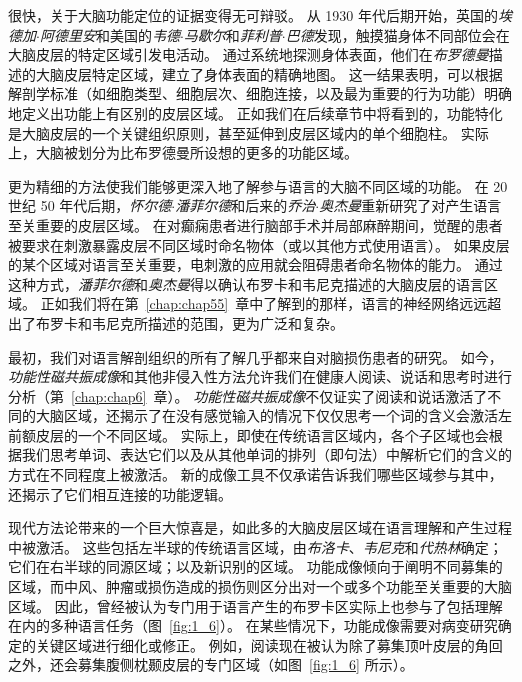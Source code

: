 很快，关于大脑功能定位的证据变得无可辩驳。
从 1930 年代后期开始，英国的\textit{埃德加$\cdot$阿德里安}和美国的\textit{韦德$\cdot$马歇尔}和\textit{菲利普$\cdot$巴德}发现，触摸猫身体不同部位会在大脑皮层的特定区域引发电活动。
通过系统地探测身体表面，他们在\textit{布罗德曼}描述的大脑皮层特定区域，建立了身体表面的精确地图。
这一结果表明，可以根据解剖学标准（如细胞类型、细胞层次、细胞连接，以及最为重要的行为功能）明确地定义出功能上有区别的皮层区域。
正如我们在后续章节中将看到的，功能特化是大脑皮层的一个关键组织原则，甚至延伸到皮层区域内的单个细胞柱。
实际上，大脑被划分为比布罗德曼所设想的更多的功能区域。



更为精细的方法使我们能够更深入地了解参与语言的大脑不同区域的功能。
在 20 世纪 50 年代后期，\textit{怀尔德$\cdot$潘菲尔德}和后来的\textit{乔治$\cdot$奥杰曼}重新研究了对产生语言至关重要的皮层区域。
在对癫痫患者进行脑部手术并局部麻醉期间，觉醒的患者被要求在刺激暴露皮层不同区域时命名物体（或以其他方式使用语言）。
如果皮层的某个区域对语言至关重要，电刺激的应用就会阻碍患者命名物体的能力。
通过这种方式，\textit{潘菲尔德}和\textit{奥杰曼}得以确认布罗卡和韦尼克描述的大脑皮层的语言区域。
正如我们将在第~\ref{chap:chap55}~章中了解到的那样，语言的神经网络远远超出了布罗卡和韦尼克所描述的范围，更为广泛和复杂。


最初，我们对语言解剖组织的所有了解几乎都来自对脑损伤患者的研究。
如今，\textit{功能性磁共振成像}和其他非侵入性方法允许我们在健康人阅读、说话和思考时进行分析（第~\ref{chap:chap6}~章）。
\textit{功能性磁共振成像}不仅证实了阅读和说话激活了不同的大脑区域，还揭示了在没有感觉输入的情况下仅仅思考一个词的含义会激活左前额皮层的一个不同区域。
实际上，即使在传统语言区域内，各个子区域也会根据我们思考单词、表达它们以及从其他单词的排列（即句法）中解析它们的含义的方式在不同程度上被激活。
新的成像工具不仅承诺告诉我们哪些区域参与其中，还揭示了它们相互连接的功能逻辑。



现代方法论带来的一个巨大惊喜是，如此多的大脑皮层区域在语言理解和产生过程中被激活。
这些包括左半球的传统语言区域，由\textit{布洛卡}、\textit{韦尼克}和\textit{代热林}确定； 它们在右半球的同源区域；以及新识别的区域。
功能成像倾向于阐明不同募集的区域，而中风、肿瘤或损伤造成的损伤则区分出对一个或多个功能至关重要的大脑区域。
因此，曾经被认为专门用于语言产生的布罗卡区实际上也参与了包括理解在内的多种语言任务（图~\ref{fig:1_6}）。
在某些情况下，功能成像需要对病变研究确定的关键区域进行细化或修正。
例如，阅读现在被认为除了募集顶叶皮层的角回之外，还会募集腹侧枕颞皮层的专门区域（如图~\ref{fig:1_6} 所示）。





